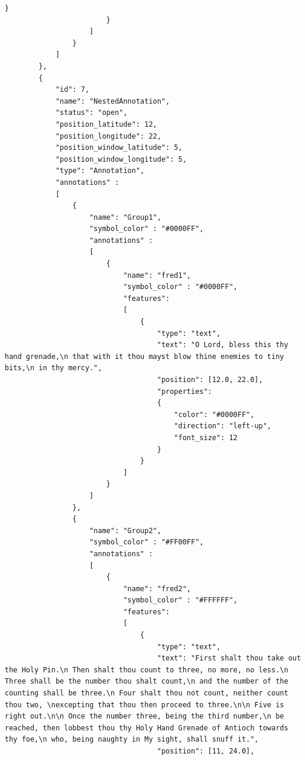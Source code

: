 \begin{lstlisting}[basicstyle=\small\ttfamily]
                            }
                        }                        
                    ]
                }
            ]
        },
        {
            "id": 7,
            "name": "NestedAnnotation",
            "status": "open",
            "position_latitude": 12,
            "position_longitude": 22,
            "position_window_latitude": 5,
            "position_window_longitude": 5,
            "type": "Annotation",
            "annotations" :
            [
                {
                    "name": "Group1",
                    "symbol_color" : "#0000FF",
                    "annotations" :
                    [
                        {
                            "name": "fred1",
                            "symbol_color" : "#0000FF",
                            "features":
                            [
                                {
                                    "type": "text",
                                    "text": "O Lord, bless this thy hand grenade,\n that with it thou mayst blow thine enemies to tiny bits,\n in thy mercy.",
                                    "position": [12.0, 22.0],
                                    "properties":
                                    {
                                        "color": "#0000FF",
                                        "direction": "left-up",
                                        "font_size": 12
                                    }
                                }
                            ]
                        }
                    ]
                },
                {
                    "name": "Group2",
                    "symbol_color" : "#FF00FF",
                    "annotations" :
                    [
                        {
                            "name": "fred2",
                            "symbol_color" : "#FFFFFF",
                            "features":
                            [
                                {
                                    "type": "text",
                                    "text": "First shalt thou take out the Holy Pin.\n Then shalt thou count to three, no more, no less.\n Three shall be the number thou shalt count,\n and the number of the counting shall be three.\n Four shalt thou not count, neither count thou two, \nexcepting that thou then proceed to three.\n\n Five is right out.\n\n Once the number three, being the third number,\n be reached, then lobbest thou thy Holy Hand Grenade of Antioch towards thy foe,\n who, being naughty in My sight, shall snuff it.",
                                    "position": [11, 24.0],

\end{lstlisting}
